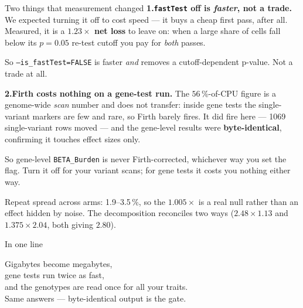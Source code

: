 \documentclass[aspectratio=169,11pt]{beamer}
\newcommand{\win}[1]{\textcolor{good}{\textbf{#1}}}
\begin{document}
\begin{frame}{Two things that measurement changed}
\textbf{1.\quad\texttt{fastTest} off is \emph{faster}, not a trade.}
We expected turning it off to cost speed --- it buys a cheap first pass, after
all. Measured, it is a \win{$1.23\times$ net loss} to leave on: when a large share
of cells fall below its $p=0.05$ re-test cutoff you pay for \emph{both} passes.

\medskip
\begin{center}
So \texttt{--is\_fastTest=FALSE} is faster \emph{and} removes a cutoff-dependent
p-value. Not a trade at all.
\end{center}

\medskip
\textbf{2.\quad Firth costs nothing on a gene-test run.}
The $56\,\%$-of-CPU figure is a genome-wide \emph{scan} number and does not
transfer: inside gene tests the single-variant markers are few and rare, so Firth
barely fires. It did fire here --- 1069 single-variant rows moved --- and the
gene-level results were \textbf{byte-identical}, confirming it touches effect
sizes only.

\medskip
\alert{So gene-level \texttt{BETA\_Burden} is never Firth-corrected,} whichever
way you set the flag. Turn it off for your variant scans; for gene tests it costs
you nothing either way.

\medskip
{\footnotesize Repeat spread across arms: 1.9--3.5\,\%, so the $1.005\times$ is a
real null rather than an effect hidden by noise. The decomposition reconciles two
ways ($2.48\times1.13$ and $1.375\times2.04$, both giving $2.80$).}
\end{frame}

\begin{frame}[standout]
In one line

\medskip
{\large
Gigabytes become megabytes, \\
gene tests run twice as fast, \\
and the genotypes are read once for all your traits. \\[1.2em]
\normalsize Same answers --- byte-identical output is the gate.
}
\end{frame}
\end{document}
